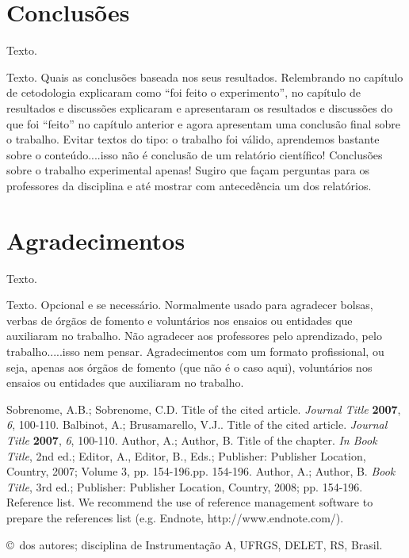 \documentclass[12pt]{eng04457}
\begin{document}
\section{Conclusões}

Texto.

Texto. Quais as conclusões baseada nos seus resultados. Relembrando no capítulo de cetodologia explicaram como “foi feito o experimento”, no capítulo de resultados e discussões explicaram e apresentaram os resultados e discussões do que foi “feito” no capítulo anterior e agora apresentam uma conclusão final sobre o trabalho. Evitar textos do tipo: o trabalho foi válido, aprendemos bastante sobre o conteúdo....isso não é conclusão de um relatório científico! Conclusões sobre o trabalho experimental apenas! Sugiro que façam perguntas para os professores da disciplina e até mostrar com antecedência um dos relatórios.

\section*{Agradecimentos}

Texto.

Texto. Opcional e se necessário. Normalmente usado para agradecer bolsas, verbas de órgãos de fomento e voluntários nos ensaios ou entidades que auxiliaram no trabalho. Não agradecer aos professores pelo aprendizado, pelo trabalho.....isso nem pensar. Agradecimentos com um formato profissional, ou seja, apenas aos órgãos de fomento (que não é o caso aqui), voluntários nos ensaios ou entidades que auxiliaram no trabalho.

\begin{thebibliography}{9}

\setlength{\parskip}{0pt}
\setlength{\itemsep}{0pt plus 0.3ex}
  
Sobrenome, A.B.; Sobrenome, C.D. Title of the cited article. \textit{Journal Title} \textbf{2007}, \textit{6}, 100-110.
Balbinot, A.; Brusamarello, V.J.. Title of the cited article. \textit{Journal Title} \textbf{2007}, \textit{6}, 100-110.
Author, A.; Author, B. Title of the chapter. \textit{In Book Title}, 2nd ed.; Editor, A., Editor, B., Eds.; Publisher: Publisher Location, Country, 2007; Volume 3, pp. 154-196.pp. 154-196.
Author, A.; Author, B. \textit{Book Title}, 3rd ed.; Publisher: Publisher Location, Country, 2008; 
pp. 154-196.
Reference list. We recommend the use of reference management software to prepare the references list (e.g. Endnote, http://www.endnote.com/).

\end{thebibliography}

\noindent \copyright \the\ano \ dos autores; disciplina de Instrumentação A, UFRGS, DELET, RS, Brasil. 
\end{document}
